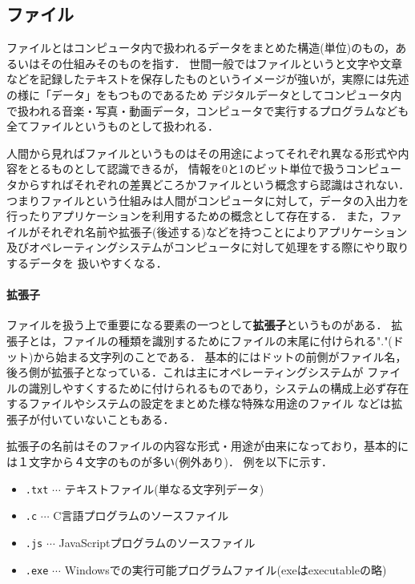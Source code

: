 \documentclass[autodetect-engine,dvi=dvipdfmx,ja=standard,a4j]{bxjsarticle}
\begin{document}
\subsection{ファイル}
ファイルとはコンピュータ内で扱われるデータをまとめた構造(単位)のもの，あるいはその仕組みそのものを指す．
世間一般ではファイルというと文字や文章などを記録したテキストを保存したものというイメージが強いが，実際には先述の様に「データ」をもつものであるため
デジタルデータとしてコンピュータ内で扱われる音楽・写真・動画データ，コンピュータで実行するプログラムなども全てファイルというものとして扱われる．

人間から見ればファイルというものはその用途によってそれぞれ異なる形式や内容をとるものとして認識できるが，
情報を0と1のビット単位で扱うコンピュータからすればそれぞれの差異どころかファイルという概念すら認識はされない．
つまりファイルという仕組みは人間がコンピュータに対して，データの入出力を行ったりアプリケーションを利用するための概念として存在する．
また，ファイルがそれぞれ名前や拡張子(後述する)などを持つことによりアプリケーション及びオペレーティングシステムがコンピュータに対して処理をする際にやり取りするデータを
扱いやすくなる．

\paragraph*{拡張子}
ファイルを扱う上で重要になる要素の一つとして\textbf{拡張子}というものがある．
拡張子とは，ファイルの種類を識別するためにファイルの末尾に付けられる"."(ドット)から始まる文字列のことである．
基本的にはドットの前側がファイル名，後ろ側が拡張子となっている．これは主にオペレーティングシステムが
ファイルの識別しやすくするために付けられるものであり，システムの構成上必ず存在するファイルやシステムの設定をまとめた様な特殊な用途のファイル
などは拡張子が付いていないこともある．

拡張子の名前はそのファイルの内容な形式・用途が由来になっており，基本的には１文字から４文字のものが多い(例外あり)．
例を以下に示す．

\begin{itemize}
    \item \texttt{.txt} $\cdots$ テキストファイル(単なる文字列データ)
    \item \texttt{.c} $\cdots$ C言語プログラムのソースファイル
    \item \texttt{.js} $\cdots$ JavaScriptプログラムのソースファイル
    \item \texttt{.exe} $\cdots$ Windowsでの実行可能プログラムファイル(exeはexecutableの略)  
\end{itemize}
\end{document}
